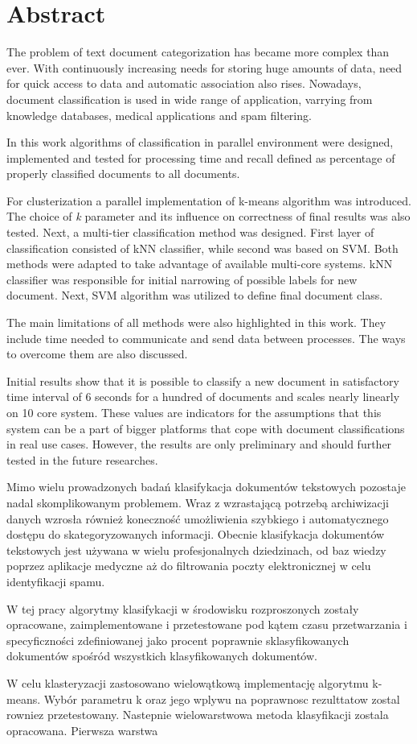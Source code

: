 \chapter*{Abstract}

The problem of text document categorization has became more complex than ever. With continuously increasing needs for storing huge amounts of data, need for quick access to data and automatic association also rises. Nowadays, document classification is used in wide range of application, varrying from knowledge databases, medical applications and spam filtering.

In this work algorithms of classification in parallel environment were designed, implemented and tested for processing time and recall defined as percentage of properly classified documents to all documents. 

For clusterization a parallel implementation of k-means algorithm was introduced. The choice of \textit{k} parameter and its influence on correctness of final results was also tested. Next, a multi-tier classification method was designed. First layer of classification consisted of kNN classifier, while second was based on SVM. Both methods were adapted to take advantage of available multi-core systems. kNN classifier was responsible for initial narrowing of possible labels for new document. Next, SVM algorithm was utilized to define final document class.

The main limitations of all methods were also highlighted in this work. They include time needed to communicate and send data between processes. The ways to overcome them are also discussed.

Initial results show that it is possible to classify a new document in satisfactory time interval of 6 seconds for a hundred of documents and scales nearly linearly on 10 core system. These values are indicators for the assumptions that this system can be a part of bigger platforms that cope with document classifications in real use cases. However, the results are only preliminary and should further tested in the future researches.

Mimo wielu prowadzonych badań klasifykacja dokumentów tekstowych pozostaje nadal skomplikowanym problemem. Wraz z wzrastającą potrzebą archiwizacji danych wzrosła również koneczność umożliwienia szybkiego i automatycznego dostępu do skategoryzowanych informacji. Obecnie klasifykacja dokumentów tekstowych jest używana w wielu profesjonalnych dziedzinach, od baz wiedzy poprzez aplikacje medyczne aż do filtrowania poczty elektronicznej w celu identyfikacji spamu.

W tej pracy algorytmy klasifykacji w środowisku rozproszonych zostały opracowane, zaimplementowane i przetestowane pod kątem czasu przetwarzania i specyficzności zdefiniowanej jako procent poprawnie sklasyfikowanych dokumentów spośród wszystkich klasyfikowanych dokumentów.

W celu klasteryzacji zastosowano wielowątkową implementację algorytmu k-means. Wybór parametru k oraz jego wplywu na poprawnosc rezulttatow zostal rowniez przetestowany. Nastepnie wielowarstwowa metoda klasyfikacji zostala opracowana. Pierwsza warstwa 